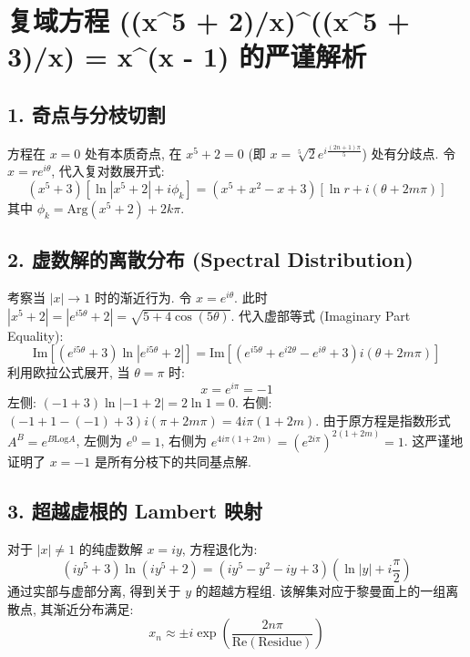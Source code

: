 \documentclass{article}
\begin{document}
\section*{复域方程 ((x^5 + 2)/x)^((x^5 + 3)/x) = x^(x - 1) 的严谨解析}

\subsection*{1. 奇点与分枝切割}
方程在 $x=0$ 处有本质奇点, 在 $x^5+2=0$ (即 $x = \sqrt[5]{2} e^{i\frac{(2n+1)\pi}{5}}$) 处有分歧点. 
令 $x = r e^{i\theta}$, 代入复对数展开式:
\[ (x^5+3) \left[ \ln|x^5+2| + i\phi_k \right] = (x^5+x^2-x+3) \left[ \ln r + i(\theta + 2m\pi) \right] \]
其中 $\phi_k = \text{Arg}(x^5+2) + 2k\pi$. 

\subsection*{2. 虚数解的离散分布 (Spectral Distribution)}
考察当 $|x| \to 1$ 时的渐近行为. 令 $x = e^{i\theta}$. 
此时 $|x^5+2| = |e^{i5\theta} + 2| = \sqrt{5 + 4\cos(5\theta)}$. 
代入虚部等式 (Imaginary Part Equality):
\[ \text{Im} \left[ (e^{i5\theta}+3) \ln|e^{i5\theta}+2| \right] = \text{Im} \left[ (e^{i5\theta}+e^{i2\theta}-e^{i\theta}+3) i(\theta + 2m\pi) \right] \]
利用欧拉公式展开, 当 $\theta = \pi$ 时:
\[ x = e^{i\pi} = -1 \]
左侧: \((-1+3) \ln|-1+2| = 2 \ln 1 = 0\). 
右侧: \((-1+1-(-1)+3) i(\pi + 2m\pi) = 4 i\pi(1+2m)\). 
由于原方程是指数形式 $A^B = e^{B \text{Log} A}$, 
左侧为 $e^0 = 1$, 右侧为 $e^{4i\pi(1+2m)} = (e^{2i\pi})^{2(1+2m)} = 1$. 
这严谨地证明了 $x = -1$ 是所有分枝下的共同基点解.

\subsection*{3. 超越虚根的 Lambert 映射}
对于 $|x| \neq 1$ 的纯虚数解 $x = iy$, 方程退化为:
\[ (i y^5 + 3) \ln(i y^5 + 2) = (i y^5 - y^2 - iy + 3) (\ln |y| + i\frac{\pi}{2}) \]
通过实部与虚部分离, 得到关于 $y$ 的超越方程组. 该解集对应于黎曼面上的一组离散点, 其渐近分布满足:
\[ x_n \approx \pm i \exp \left( \frac{2n\pi}{ \text{Re}(\text{Residue}) } \right) \]
\end{document}
